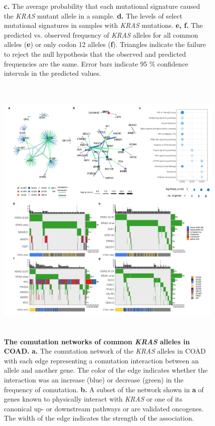 \documentclass[english, 12pt, letterpaper]{article}
\newcommand{\KRAS}{\emph{KRAS}}
\begin{document}
\begin{figure}[p]
{    \textbf{c.} The average probability that each mutational signature caused the \KRAS{} mutant allele in a sample.
    \textbf{d.} The levels of select mutational signatures in samples with \KRAS{} mutations.
    \textbf{e, f.} The predicted vs. observed frequency of \KRAS{} alleles for all common alleles (\textbf{e}) or only codon 12 alleles (\textbf{f}). Triangles indicate the failure to reject the null hypothesis that the observed and predicted frequencies are the same. Error bars indicate 95 \% confidence intervals in the predicted values.
    }
    \label{fig:mutational-signatures-main}
\end{figure}

\begin{figure}[p]
\centering
\includegraphics[height=135mm]{figures/Figure_02.jpeg}
\caption{
    \textbf{The comutation networks of common \KRAS{} alleles in COAD.}
    \textbf{a.} The comutation network of the \KRAS{} alleles in COAD with each edge representing a comutation interaction between an allele and another gene. The color of the edge indicates whether the interaction was an increase (blue) or decrease (green) in the frequency of comutation.
    \textbf{b.} A subset of the network shown in \textbf{a} of genes known to physically interact with \KRAS{} or one of its canonical up- or downstream pathways or are validated oncogenes. The width of the edge indicates the strength of the association.
}
\end{figure}
\end{document}
